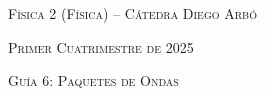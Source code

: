 \documentclass[11pt,spanish]{article}
\begin{document}
    \begin{center}
    \textsc{\large Física 2 (Física) -- Cátedra Diego Arbó}
    \par\end{center}{\large \par}
    
    \begin{center}
    \textsc{\large Primer Cuatrimestre de 2025}
    \par\end{center}{\large \par}
    
    \begin{center}
    \textsc{\large Guía 6: Paquetes de Ondas}
    \par\end{center}{\large \par}
\end{document}
